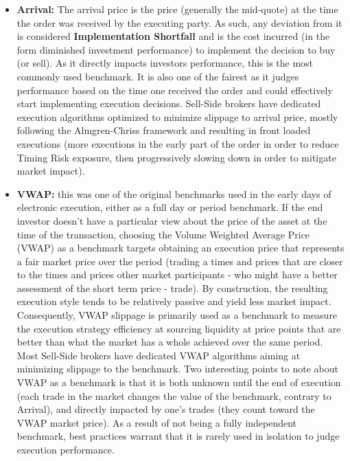 \begin{itemize}
\item \textbf{Arrival:} The arrival price is the price (generally the mid-quote) at the time the order was received by the executing party. As such, any deviation from it is considered \textbf{Implementation Shortfall} and is the cost incurred (in the form diminished investment performance) to implement the decision to buy (or sell). As it directly impacts investors performance, this is the most commonly used benchmark. It is also one of the fairest as it judges performance based on the time one received the order and could effectively start implementing execution decisions. Sell-Side brokers have dedicated execution algorithms optimized to minimize slippage to arrival price, mostly following the Almgren-Chriss framework and resulting in front loaded executions (more executions in the early part of the order in order to reduce Timing Risk exposure, then progressively slowing down in order to mitigate market impact).

\item \textbf{VWAP:} this was one of the original benchmarks used in the early days of electronic execution, either as a full day or period benchmark. If the end investor doesn't have a particular view about the price of the asset at the time of the transaction, choosing the Volume Weighted Average Price (VWAP) as a benchmark targets obtaining an execution price that represents a fair market price over the period (trading a times and prices that are closer to the times and prices other market participants - who might have a better assessment of the short term price - trade). By construction, the resulting execution style tends to be relatively passive and yield  less market impact. Consequently, VWAP slippage is primarily used as a benchmark to measure the execution strategy efficiency at sourcing liquidity at price points that are better than what the market has a whole achieved over the same period.
Most Sell-Side brokers have dedicated VWAP algorithms aiming at minimizing slippage to the benchmark. Two interesting points to note about VWAP as a benchmark is that it is both unknown until the end of execution (each trade in the market changes the value of the benchmark, contrary to Arrival), and directly impacted by one's trades (they count toward the VWAP market price). As a result of not being a fully independent benchmark, best practices warrant that it is rarely used in isolation to judge execution performance.


\end{itemize}
